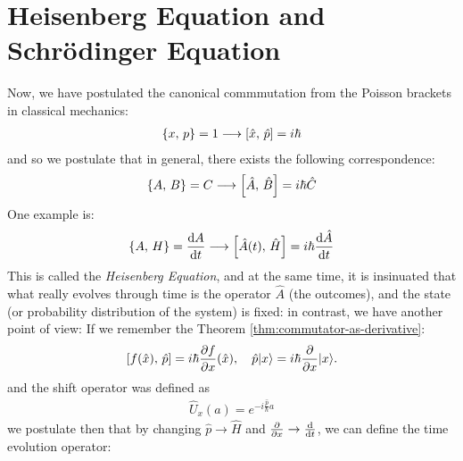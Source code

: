 \section{Heisenberg Equation and Schrödinger Equation}
Now, we have postulated the canonical commmutation from the Poisson brackets in classical mechanics:
\begin{align}
  \left\lbrace x ,\, p \right\rbrace = 1 \longrightarrow \left\lbrack \hat{x} ,\, \hat{p} \right\rbrack = i \hbar
\end{align}
and so we postulate that in general, there exists the following correspondence:
\begin{align}
  \left\lbrace A ,\, B \right\rbrace = C \longrightarrow \left\lbrack \hat{A} ,\, \hat{B} \right\rbrack = i \hbar \hat{C}
\end{align}
One example is:
\begin{align}
  \pobra{A}{H} = \odv{A}{t} \longrightarrow \commt{\hat{A}(t)}{\hat{H}} = i \hbar \odv{\hat{A}}{t}
\end{align}
This is called the \emph{Heisenberg Equation}, and at the same time,
it is insinuated that what really evolves through time is the operator $\hat{A}$ (the outcomes), and the state (or probability distribution of the system) is fixed:
in contrast, we have another point of view:
If we remember the Theorem \ref{thm:commutator-as-derivative}:
\begin{align}
  \left\lbrack f(\hat{x}) ,\, \hat{p} \right\rbrack = i \hbar \pdv{f}{x}(\hat{x}), \quad
  \hat{p}\lvert x\rangle = i \hbar \pdv{}{x} \lvert x\rangle.
\end{align}
and the shift operator was defined as
\begin{align}
  \hat{U}_x(a) = e^{- i \frac{\hat{p}}{\hbar} a}
\end{align}
we postulate then that by changing $\hat{p} \to \hat{H}$ and $\pdv{}{x} \to \odv{}{t}$, we can define the time evolution operator:
